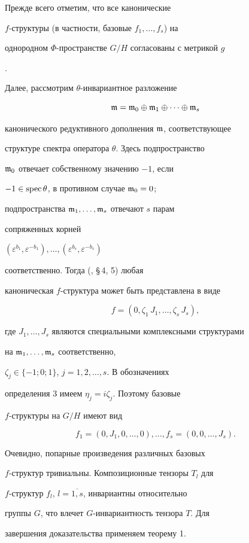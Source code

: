\begin{pf}


Прежде всего отметим, что все канонические


$f$-структуры (в частности, базовые $f_1,\dotsc,f_s$) на


однородном $\Phi$-пространстве $G/H$ согласованы с метрикой $g$


\cite{28}.





Далее, рассмотрим $\theta$-инвариантное разложение


$$


\frak{m}=\frak{m}_0\oplus\frak{m}_1\oplus\dotsb\oplus\frak{m}_s


$$


канонического редуктивного дополнения $\frak{m}$, соответствующее


структуре спектра оператора $\theta$. Здесь подпространство


$\frak{m}_0$ отвечает собственному значению $-1$, если


$-1\in\operatorname{spec}\theta$, в противном случае $\frak{m}_0={0}$;


подпространства $\frak{m}_1,\dotsc,\frak{m}_s$ отвечают $s$ парам


сопряженных корней


$(\varepsilon^{b_1},\varepsilon^{-b_1}),\dotsc,


(\varepsilon^{b_s},\varepsilon^{-b_s})$


соответственно. Тогда (\cite{13}, \S\,4, 5) любая


каноническая $f$-структура может быть представлена в виде


$$


f=(0,\zeta_1\,J_1,\dotsc,\zeta_s\,J_s),


$$


где $J_1,\dotsc,J_s$ являются специальными комплексными структурами


на $\frak{m}_1,\dotsc,\frak{m}_s$ соответственно,


$\zeta_j\in\{-1;0;1\}$, $j=1,2,\dotsc,s$. В обозначениях


определения 3 имеем $\eta_j=i\zeta_j$. Поэтому базовые


$f$-структуры на $G/H$ имеют вид


$$


f_1=(0,J_1,0,\dotsc,0),\dotsc,f_s=(0,0,\dotsc,J_s).


$$





Очевидно, попарные произведения различных базовых


$f$-структур тривиальны. Композиционные тензоры $T_l$ для


$f$-структур $f_l$, $l=\overline{1,s}$, инвариантны относительно


группы $G$, что влечет $G$-инвариантность тензора $T$. Для


завершения доказательства применяем теорему 1.


\end{pf}





